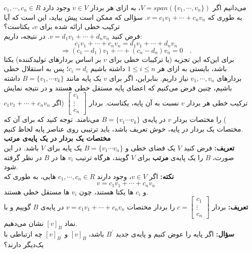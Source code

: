 می‌دانیم اگر $V = span(\{v_1,\cdots,v_n\})$، به ازای هر بردار $v\in V$ وجود دارد $c_1,\cdots,c_n\in R$ به طوری که $v=c_1v_1+\cdots+c_nv_n$. سؤالی که ممکن است پیش بیاید، این است که آیا ترکیب خطی ارائه شده برای $v$، یکتاست؟\\
فرض کنید $v=d_1v_1+\cdots+d_nv_n$. در نتیجه، داریم:
$$c_1v_1+\cdots+c_nv_n=d_1v_1+\cdots+d_nv_n$$
$$\Rightarrow (c_1-d_1)v_1+\cdots+(c_n-d_n)v_n=0\quad.$$
برای این‌که این تجزیه (یا ترکیبات خطی برای $v$ بر اساس بردار‌های تولید‌کننده) یکتا باشد، بایستی به ازای هر $1\leq i\leq n$ داشته باشیم $c_i=d_i$؛ پس به استقلال خطی بردار‌های $v_1,\cdots,v_n$ نیاز داریم. بنابراین، اگر برای $v$ یک پایه مانند $B=\{v_1,\cdots v_k\}$ داشته باشیم، چنین فرض می‌کنیم که اعضای پایه مستقل خطی هستند و در نتیجه نمایش ترکیب خطی هر بردار $v$ نسبت به آن پایه، یکتاست. بردار $\begin{bmatrix}
c_1\\ \vdots \\ c_n
\end{bmatrix}$
 (اگر $c_1v_1+\cdots+c_nv_n$) را مختصات بردار $v$ در پایه‌ی $B=\{v_1\cdots v_k\}$ می‌نامند. توجه کنید که برای آن که مختصات یک بردار در پایه، خوش تعریف باشد، باید ترتیبی روی عناصر پایه لحاظ کنیم.\\
\textbf{مختصات یک بردار در یک پایه‌ی مرتب }\\
\textbf{تعریف: }
فرض کنید $V$ یک فضا‌ی خطی و $B=\{v_1\cdots v_n\}$ یک پایه برای $V$ باشد. در این صورت، $B$ را یک پایه‌ی \textbf{مرتب} برای $V$ گویند، هرگاه ترتیب $v_i$ ها در $B$ در نظر گرفته شود.\\
\textbf{نکته:}
اگر $v\in V$، وجود دارند $c_1,\cdots,c_n\in R$ هایی، به طوری که $$v=c_1v_1+\cdots+c_nv_n$$ و $c_i$ ها یکتا هستند، چون $v_i$ ها مستقل خطی هستند.\\
\textbf{تعریف:}
بردار $c=\begin{bmatrix}
c_1\\ \vdots \\ c_n
\end{bmatrix}$ را بردار مختصات $v = c_1 v_1 + \cdots + c_n v_n$ در پایه‌ی $B$ گوییم و با نماد $[v]_B$ نشان می‌دهیم.\\
\textbf{سؤال:}
اگر پایه را عوض کنیم و پایه‌ی جدید $B^\prime$ باشد، $[v]_B$ و $[v]_{B^\prime}$ چه ارتباطی با یک‌دیگر دارند؟

